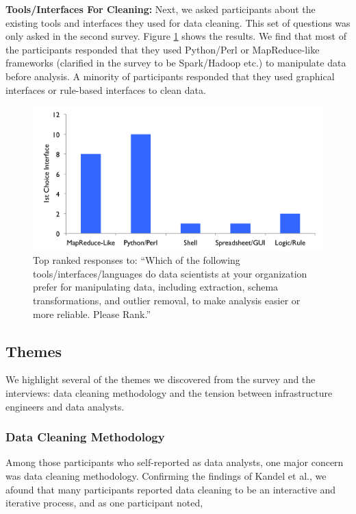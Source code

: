 \vspace{0.5em}
\noindent\textbf{Tools/Interfaces For Cleaning: } Next, we asked participants about the existing tools and interfaces they used for data cleaning. This set of questions was only asked in the second survey. Figure \ref{fig:interfaces} shows the results. We find that most of the participants responded that they used Python/Perl or MapReduce-like frameworks (clarified in the survey to be Spark/Hadoop etc.) to manipulate data before analysis. A minority of participants responded that they used graphical interfaces or rule-based interfaces to clean data.

\begin{figure}[t]
\centering
 \includegraphics[width=\columnwidth]{datafigs/hilda-interface.png}
 \caption{Top ranked responses to: ``Which of the following tools/interfaces/languages do data scientists at your organization prefer for manipulating data, including extraction, schema transformations, and outlier removal, to make analysis easier or more reliable. Please Rank.''\label{fig:interfaces}}
\end{figure}


\subsection{Themes}\label{sec:themes}
We highlight several of the themes we discovered from the survey and the interviews: data cleaning methodology and the tension between infrastructure engineers and data analysts.

\subsubsection{Data Cleaning Methodology}
Among those participants who self-reported as data analysts, one major concern was data cleaning methodology.
Confirming the findings of Kandel et al., we afound that many participants reported data cleaning to be an interactive and iterative process, and as one participant noted,

